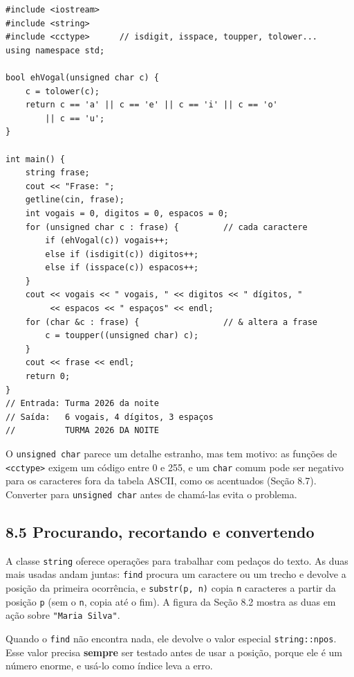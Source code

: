\begin{codigo}
\begin{Verbatim}[breaklines=true, breaksymbolleft={}, fontsize=\footnotesize]
#include <iostream>
#include <string>
#include <cctype>      // isdigit, isspace, toupper, tolower...
using namespace std;

bool ehVogal(unsigned char c) {
    c = tolower(c);
    return c == 'a' || c == 'e' || c == 'i' || c == 'o'
        || c == 'u';
}

int main() {
    string frase;
    cout << "Frase: ";
    getline(cin, frase);
    int vogais = 0, digitos = 0, espacos = 0;
    for (unsigned char c : frase) {         // cada caractere
        if (ehVogal(c)) vogais++;
        else if (isdigit(c)) digitos++;
        else if (isspace(c)) espacos++;
    }
    cout << vogais << " vogais, " << digitos << " dígitos, "
         << espacos << " espaços" << endl;
    for (char &c : frase) {                 // & altera a frase
        c = toupper((unsigned char) c);
    }
    cout << frase << endl;
    return 0;
}
// Entrada: Turma 2026 da noite
// Saída:   6 vogais, 4 dígitos, 3 espaços
//          TURMA 2026 DA NOITE
\end{Verbatim}
\end{codigo}

O \texttt{unsigned char} parece um detalhe estranho, mas tem motivo: as funções de \texttt{<cctype>} exigem um código entre 0 e 255, e um \texttt{char} comum pode ser negativo para os caracteres fora da tabela ASCII, como os acentuados (Seção 8.7). Converter para \texttt{unsigned char} antes de chamá-las evita o problema.

\subsection{8.5 Procurando, recortando e convertendo}

A classe \texttt{string} oferece operações para trabalhar com pedaços do texto. As duas mais usadas andam juntas: \texttt{find} procura um caractere ou um trecho e devolve a posição da primeira ocorrência, e \texttt{substr(p, n)} copia \texttt{n} caracteres a partir da posição \texttt{p} (sem o \texttt{n}, copia até o fim). A figura da Seção 8.2 mostra as duas em ação sobre \texttt{"Maria Silva"}.

Quando o \texttt{find} não encontra nada, ele devolve o valor especial \texttt{string::npos}. Esse valor precisa \textbf{sempre} ser testado antes de usar a posição, porque ele é um número enorme, e usá-lo como índice leva a erro.

